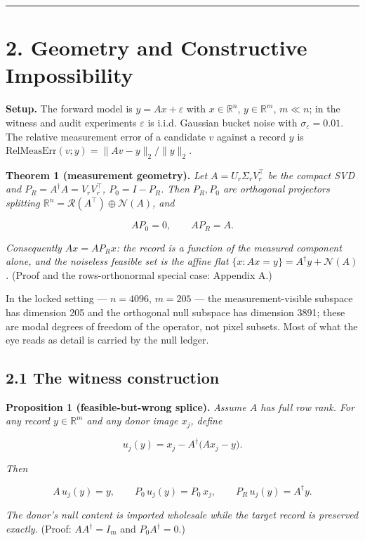 \documentclass[11pt]{article}
\begin{document}
\medskip\hrule\medskip

\section*{2. Geometry and Constructive Impossibility}

\textbf{Setup.} The forward model is $y = Ax + \varepsilon$ with $x \in \mathbb{R}^n$, $y \in \mathbb{R}^m$, $m \ll n$; in the witness and audit experiments $\varepsilon$ is i.i.d. Gaussian bucket noise with $\sigma_\varepsilon = 0.01$. The relative measurement error of a candidate $v$ against a record $y$ is $\mathrm{RelMeasErr}(v;y) = \lVert Av - y\rVert_2/\lVert y\rVert_2$.

\textbf{Theorem 1 (measurement geometry).} \textit{Let $A = U_r \Sigma_r V_r^\top$ be the compact SVD and $P_R = A^\dagger A = V_r V_r^\top$, $P_0 = I - P_R$. Then $P_R, P_0$ are orthogonal projectors splitting $\mathbb{R}^n = \mathcal{R}(A^\top) \oplus \mathcal{N}(A)$, and}

$$A P_0 = 0, \qquad A P_R = A.$$

\textit{Consequently $Ax = A P_R x$: the record is a function of the measured component alone, and the noiseless feasible set is the affine flat $\{x: Ax = y\} = A^\dagger y + \mathcal{N}(A)$.} (Proof and the rows-orthonormal special case: Appendix A.)

In the locked setting --- $n = 4096$, $m = 205$ --- the measurement-visible subspace has dimension 205 and the orthogonal null subspace has dimension 3891; these are modal degrees of freedom of the operator, not pixel subsets. Most of what the eye reads as detail is carried by the null ledger.

\subsection*{2.1 The witness construction}

\textbf{Proposition 1 (feasible-but-wrong splice).} \textit{Assume $A$ has full row rank. For any record $y \in \mathbb{R}^m$ and any donor image $x_j$, define}

$$u_j(y) = x_j - A^\dagger\big(A x_j - y\big).$$

\textit{Then}

$$A\,u_j(y) = y, \qquad P_0\,u_j(y) = P_0\, x_j, \qquad P_R\, u_j(y) = A^\dagger y.$$

\textit{The donor's null content is imported wholesale while the target record is preserved exactly.} (Proof: $AA^\dagger = I_m$ and $P_0 A^\dagger = 0$.)
\end{document}
